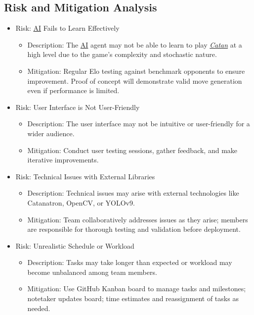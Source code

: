 \documentclass{article}
\newcommand{\Catan}{\href{https://en.wikipedia.org/wiki/Catan}{Catan}}
\newcommand{\AI}{\href{https://en.wikipedia.org/wiki/Artificial_intelligence}{AI}}
\begin{document}
\subsection{Risk and Mitigation Analysis}\label{subsec:risk}
\begin{itemize}
    \item {Risk: \AI{} Fails to Learn Effectively}
    \begin{itemize}
        \item Description: The \AI{} agent may not be able to learn to play \emph{\Catan{}} at a high level due to the game's complexity and stochastic nature.
        \item Mitigation: Regular Elo testing against benchmark opponents to ensure improvement. Proof of concept will demonstrate valid move generation even if performance is limited.
    \end{itemize}

    \item {Risk: User Interface is Not User-Friendly}
    \begin{itemize}
        \item Description: The user interface may not be intuitive or user-friendly for a wider audience.
        \item Mitigation: Conduct user testing sessions, gather feedback, and make iterative improvements.
    \end{itemize}

    \item {Risk: Technical Issues with External Libraries}
    \begin{itemize}
        \item Description: Technical issues may arise with external technologies like Catanatron, OpenCV, or YOLOv9.
        \item Mitigation: Team collaboratively addresses issues as they arise; members are responsible for thorough testing and validation before deployment.
    \end{itemize}

    \item {Risk: Unrealistic Schedule or Workload}
    \begin{itemize}
        \item Description: Tasks may take longer than expected or workload may become unbalanced among team members.
        \item Mitigation: Use GitHub Kanban board to manage tasks and milestones; notetaker updates board; time estimates and reassignment of tasks as needed.
    \end{itemize}
\end{itemize}
\end{document}
